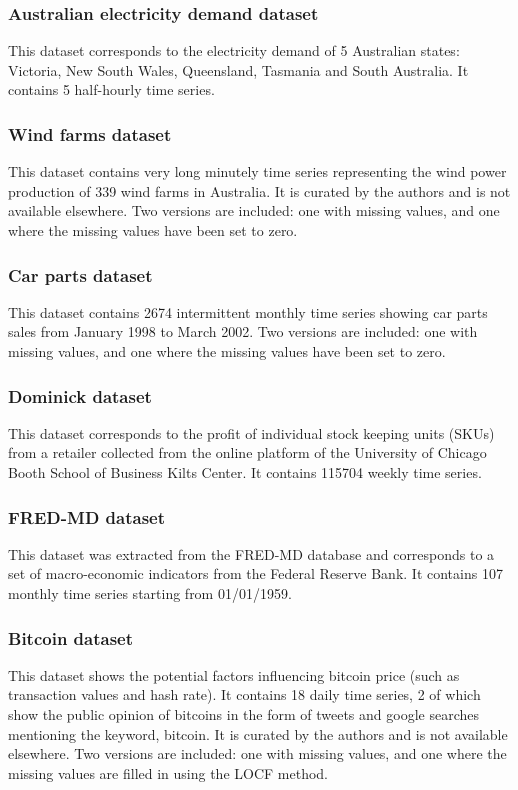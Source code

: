 \documentclass{article}
\begin{document}
\subsubsection{Australian electricity demand dataset}
This dataset corresponds to the electricity demand of 5 Australian states: Victoria, New South Wales, Queensland, Tasmania and South Australia. It contains 5 half-hourly time series.

\subsubsection{Wind farms dataset}
This dataset contains very long minutely time series representing the wind power production of 339
wind farms in Australia. It is curated by the authors and is not available elsewhere. Two versions are included: one with missing values, and one where the missing values have been set to zero.

\subsubsection{Car parts dataset}
This dataset contains 2674 intermittent monthly time series showing car parts sales from January
1998 to March 2002. Two versions are included: one with missing values, and one where the missing values have been set to zero.

\subsubsection{Dominick dataset}
This dataset corresponds to the profit of individual stock keeping units (SKUs) from a retailer collected from the online platform of the University of Chicago Booth School of Business Kilts Center. It contains 115704 weekly time series.

\subsubsection{FRED-MD dataset}
This dataset was extracted from the FRED-MD database and corresponds to  a set of macro-economic indicators from the Federal Reserve Bank. It contains 107 monthly time series starting from  01/01/1959.

\subsubsection{Bitcoin dataset}
This dataset shows the potential factors influencing bitcoin price (such as transaction values and hash rate). It contains 18 daily time series, 2 of which show the public opinion of bitcoins in the form of tweets and google searches mentioning the keyword, bitcoin. It is curated by the authors and is not available elsewhere. Two versions are included: one with missing values, and one where the missing values are filled in using the LOCF method.
\end{document}
